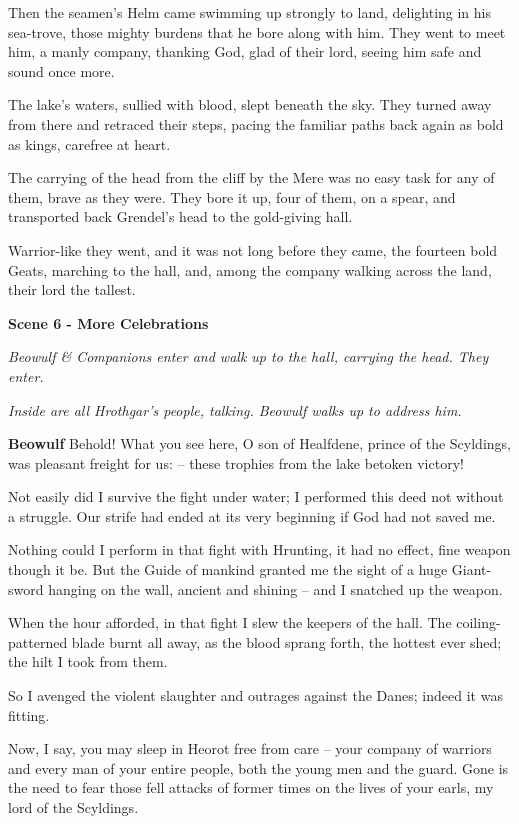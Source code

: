 \documentclass[a4paper]{article}
\begin{document}
{Then the seamen’s Helm came swimming up
strongly to land, delighting in his sea-trove,
those mighty burdens that he bore along with him.
They went to meet him, a manly company,
thanking God, glad of their lord,
seeing him safe and sound once more.

The lake’s waters,
sullied with blood, slept beneath the sky.
They turned away from there and retraced their steps,
pacing the familiar paths back again
as bold as kings, carefree at heart.

The carrying of the head from the cliff by the Mere
was no easy task for any of them,
brave as they were. They bore it up,
four of them, on a spear, and transported back
Grendel’s head to the gold-giving hall.

Warrior-like they went, and it was not long
before they came, the fourteen bold Geats,
marching to the hall, and, among the company
walking across the land, their lord the tallest.

\centerline{\textbf{Scene 6 - More Celebrations}}

\centerline{\textit{Beowulf \& Companions enter and walk up to the hall, carrying the head. They enter.}}
\centerline{\textit{Inside are all Hrothgar's people, talking. Beowulf walks up to address him.}}

\textbf{Beowulf} Behold! What you see here, O son of Healfdene,
prince of the Scyldings, was pleasant freight for us:
– these trophies from the lake betoken victory!

Not easily did I survive
the fight under water; I performed this deed
not without a struggle. Our strife had ended
at its very beginning if God had not saved me.

Nothing could I perform in that fight with Hrunting,
it had no effect, fine weapon though it be.
But the Guide of mankind granted me the sight
of a huge Giant-sword hanging on the wall,
ancient and shining – and I snatched up the weapon.

When the hour afforded, in that fight I slew
the keepers of the hall. The coiling-patterned
blade burnt all away, as the blood sprang forth,
the hottest ever shed; the hilt I took from them.

So I avenged the violent slaughter
and outrages against the Danes; indeed it was fitting.

Now, I say, you may sleep in Heorot
free from care – your company of warriors
and every man of your entire people,
both the young men and the guard. Gone is the need
to fear those fell attacks of former times
on the lives of your earls, my lord of the Scyldings.

}
\end{document}
